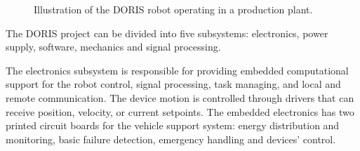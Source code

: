 \documentclass{ifacconf}
\begin{document}
\begin{figure}[ht]
\centering
{} 
\vspace{-.1cm}
\caption{Illustration of the DORIS robot operating in a production plant.}\vspace{-0.25cm}
\label{fig:DORIS-overview}
\end{figure}

The DORIS project can be divided into five subsystems: electronics, power
supply, software, mechanics and signal processing.

The electronics subsystem is responsible for providing embedded computational
support for the robot control, signal processing, task managing, and local and
remote communication. The device motion is controlled through drivers that can
receive position, velocity, or current setpoints. The embedded electronics has
two printed circuit boards for the vehicle support system: energy distribution
and monitoring, basic failure detection, emergency handling and devices'
control.

\end{document}
